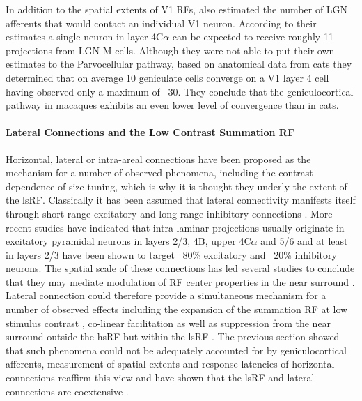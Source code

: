 In addition to the spatial extents of V1 RFs, \cite{Angelucci2006a}
also estimated the number of LGN afferents that would contact an
individual V1 neuron. According to their estimates a single neuron in
layer 4C$\alpha$ can be expected to receive roughly 11 projections
from LGN M-cells. Although they were not able to put their own
estimates to the Parvocellular pathway, based on anatomical data from
cats they determined that on average 10 geniculate cells converge on a
V1 layer 4 cell having observed only a maximum of ~30. They conclude
that the geniculocortical pathway in macaques exhibits an even lower
level of convergence than in cats.

\paragraph{Lateral Connections and the Low Contrast Summation RF}

Horizontal, lateral or intra-areal connections have been proposed as
the mechanism for a number of observed phenomena, including the
contrast dependence of size tuning, which is why it is thought they
underly the extent of the lsRF. Classically it has been assumed that
lateral connectivity manifests itself through short-range excitatory
and long-range inhibitory connections
\citep{VonderMalsburg1973,Obermayer1990b}. More recent studies have
indicated that intra-laminar projections usually originate in
excitatory pyramidal neurons in layers 2/3, 4B, upper 4C$\alpha$ and
5/6 and at least in layers 2/3 have been shown to target ~80\%
excitatory and ~20\% inhibitory neurons. The spatial scale of these
connections has led several studies to conclude that they may mediate
modulation of RF center properties in the near surround
\citep{Angelucci2002}. Lateral connection could therefore provide a
simultaneous mechanism for a number of observed effects including the
expansion of the summation RF at low stimulus contrast
\citep{Sceniak1999}, co-linear facilitation \citep{Mizobe2001} as well
as suppression from the near surround outside the hsRF but within the
lsRF \citep{Sceniak2001,Levitt2002}. The previous section showed that
such phenomena could not be adequately accounted for by
geniculocortical afferents, measurement of spatial extents and
response latencies of horizontal connections reaffirm this view and
have shown that the lsRF and lateral connections are coextensive
\citep{Angelucci2002}.


